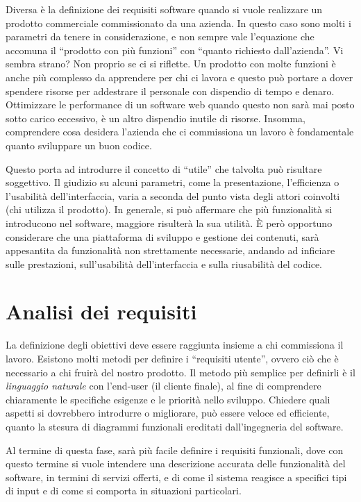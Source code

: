 Diversa è la definizione dei requisiti software quando si vuole realizzare un prodotto commerciale commissionato da una azienda. In questo caso sono molti i parametri da tenere in considerazione, e non sempre vale l'equazione che accomuna il ``prodotto con più funzioni'' con ``quanto richiesto dall'azienda''. Vi sembra strano? Non proprio se ci si riflette. Un prodotto con molte funzioni è anche più complesso da apprendere per chi ci lavora e questo può portare a dover spendere risorse per addestrare il personale con dispendio di tempo e denaro. Ottimizzare le performance di un software web quando questo non sarà mai posto sotto carico eccessivo, è un altro dispendio inutile di risorse. Insomma, comprendere cosa desidera l'azienda che ci commissiona un lavoro è fondamentale quanto sviluppare un buon codice.

Questo porta ad introdurre il concetto di ``utile'' che talvolta può risultare soggettivo. Il giudizio su alcuni parametri, come la presentazione, l'efficienza o l'usabilità dell'interfaccia, varia a seconda del punto vista degli attori coinvolti (chi utilizza il prodotto). In generale, si può affermare che più funzionalità si introducono nel software, maggiore risulterà la sua utilità. \`E però opportuno considerare che una piattaforma di sviluppo e gestione dei contenuti, sarà appesantita da funzionalità non strettamente necessarie, andando ad inficiare sulle prestazioni, sull'usabilità dell'interfaccia e sulla riusabilità del codice.

\section*{Analisi dei requisiti}
La definizione degli obiettivi deve essere raggiunta insieme a chi commissiona il lavoro. Esistono molti metodi per definire i ``requisiti utente'', ovvero ciò che è necessario a chi fruirà del nostro prodotto. Il metodo più semplice per definirli è il \emph{linguaggio naturale} con l'end-user (il cliente finale), al fine di comprendere chiaramente le specifiche esigenze e le priorità nello sviluppo. Chiedere quali aspetti si dovrebbero introdurre o migliorare, può essere veloce ed efficiente, quanto la stesura di diagrammi funzionali ereditati dall'ingegneria del software. 

Al termine di questa fase, sarà più facile definire i requisiti funzionali, dove con questo termine si vuole intendere una descrizione accurata delle funzionalità del software, in termini di servizi offerti, e di come il sistema reagisce a specifici tipi di input e di come si comporta in situazioni particolari.

